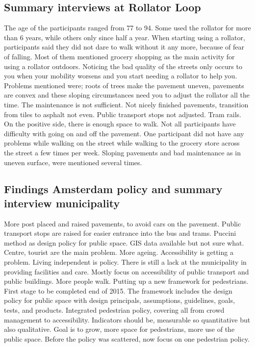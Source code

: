 \subsection{Summary interviews at Rollator Loop}
The age of the participants ranged from 77 to 94. Some used the rollator for more than 6 years, while others only since half a year. When starting using a rollator, participants said they did not dare to walk without it any more, because of fear of falling. Most of them mentioned grocery shopping as the main activity for using a rollator outdoors.
Noticing the bad quality of the streets only occurs to you when your mobility worsens and you start needing a rollator to help you. 
Problems mentioned were; roots of trees make the pavement uneven, pavements are convex and these sloping circumstances need you to adjust the rollator all the time. The maintenance is not sufficient. Not nicely finished pavements, transition from tiles to asphalt not even. Public transport stops not adjusted. Tram rails. 
On the positive side, there is enough space to walk. Not all participants have difficulty with going on and off the pavement. 
One participant did not have any problems while walking on the street while walking to the grocery store across the street a few times per week. 
Sloping pavements and bad maintenance as in uneven surface, were mentioned several times. 

\subsection{Findings Amsterdam policy and summary interview municipality}
More post placed and raised pavements, to avoid cars on the pavement.
Public transport stops are raised for easier entrance into the bus and trams. 
Puccini method as design policy for public space. 
GIS data available but not sure what. 
Centre, tourist are the main problem. 
More ageing. Accessibility is getting a problem. Living independent is policy. There is still a lack at the municipality in providing facilities and care. 
Mostly focus on accessibility of public transport and public buildings. 
More people walk. 
Putting up a new framework for pedestrians. First stage to be completed end of 2015. The framework includes the design policy for public space with design principals, assumptions, guidelines, goals, tests, and products. 
Integrated pedestrian policy, covering all from crowd management to accessibility. 
Indicators should be, measurable so quantitative but also qualitative.
Goal is to grow, more space for pedestrians, more use of the public space.
Before the policy was scattered, now focus on one pedestrian policy. 


